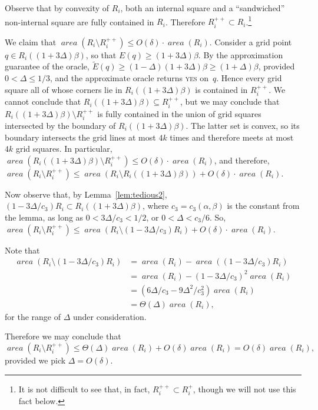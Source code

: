 \documentclass[11pt]{article}
\theoremstyle{remark}
\newcommand{\old}[1]{{{}}}
\DeclareMathOperator{\area}{\mathit{area}}
\def\EE{\tilde{E}}
\begin{document}
\begin{enumerate}[(i)]
Observe that by convexity of $R_i$, both an internal square and a ``sandwiched'' non-internal square are fully contained in $R_i$.  Therefore $R_i^{++} \subset R_i$.\footnote{It is not difficult to see that, in fact, $R_i^{++} \subset R_i^+$, 
though we will not use this fact below.}



We claim that $\area(R_i \setminus R_i^{++}) \leq O(\delta) \cdot \area(R_i)$.  Consider a grid point $q \in R_i((1+3\Delta)\beta)$, so that $E(q)\geq (1+3\Delta)\beta$.  By the approximation guarantee of the oracle, $\EE(q)\geq (1-\Delta)(1+3\Delta)\beta \geq (1+\Delta)\beta$, provided $0 < \Delta \leq 1/3$, and the approximate oracle returns \textsc{yes} on~$q$.  Hence every grid square all of whose corners lie in $R_i((1+3\Delta)\beta)$ is contained in $R_i^{++}$.  We cannot conclude that $R_i((1+3\Delta)\beta) \subseteq R_i^{++}$, but we may conclude that
$R_i((1+3\Delta)\beta) \setminus R_i^{++}$ is fully contained in the union of grid squares intersected by the boundary of $R_i((1+3\Delta)\beta)$.  The latter set is convex, so its boundary intersects the grid lines at most $4k$ times and therefore meets at most $4k$ grid squares.  In particular,
$\area(R_i((1+3\Delta)\beta) \setminus R_i^{++}) \leq O(\delta) \cdot \area(R_i)$, and therefore, 
$\area(R_i \setminus R^{++}_i) \leq \area(R_i \setminus R_i((1+3\Delta)\beta)) + O(\delta) \cdot \area(R_i)$.


Now observe that, by Lemma~\ref{lem:tedious2}, $(1-3\Delta/c_3)R_i \subset R_i((1+3\Delta)\beta)$, where $c_3=c_3(\alpha,\beta)$ is the constant from the lemma, as long as $0<3\Delta/c_3 < 1/2$, or $0<\Delta<c_3/6$.
So, $\area(R_i \setminus R^{++}_i) \leq \area(R_i \setminus (1-3\Delta/c_3)R_i) + O(\delta) \cdot \area(R_i)$.

Note that
\begin{align*}
  \area (R_i \setminus (1-3\Delta/c_3)R_i) 
& = \area (R_i) - \area ((1-3\Delta/c_3)R_i) \\
& = \area (R_i) - (1-3\Delta/c_3)^2 \area (R_i) \\
& = (6\Delta/c_3 - 9\Delta^2/c_3^2) \area (R_i)\\
& = \Theta(\Delta) \area(R_i),
\end{align*}
for the range of $\Delta$ under consideration.


Therefore we may conclude that
\[
\area(R_i \setminus R^{++}_i) \leq \Theta(\Delta)\area(R_i) + O(\delta)\area(R_i) = O(\delta)\area(R_i),
\]
\old{
Therefore we may conclude that\footnote{We use the following identity: For four sets $A$, $B$, $C$, $D$ with $B,C \subset D \subset  A$, $A \setminus B \subset (A \setminus C) \cup (D \setminus B)$.}
\begin{align*}
\area(R_i \setminus R^{++}_i) 
& \leq
\area (R_i \setminus (1-3\Delta/c_3)R_i) +
\area (R_i((1+3\Delta)\beta) \setminus R_i^{++})\\
& = (\Theta(\Delta) + O(\delta))\area(R_i) = O(\delta)\area(R_i),
\end{align*}
}
provided we pick $\Delta=O(\delta)$.


\end{enumerate}
\end{document}
